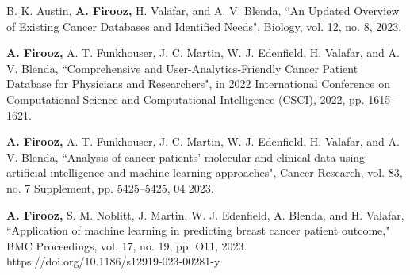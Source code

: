 
\def\spaceBetween{-1cm}
\def\spaceAfter{0.1cm}


\begin{cvpublication}
    \vspace{-2mm}
    \cvpub
        {\begin{cvitems}
            \item {B. K. Austin, \textbf{A. Firooz,} H. Valafar, and A. V. Blenda, “An Updated Overview of Existing Cancer Databases and Identified Needs", Biology, vol. 12, no. 8, 2023.}
        \end{cvitems}}
        {}
    \cvpub
        {\begin{cvitems}
            \item {\textbf{A. Firooz,} A. T. Funkhouser, J. C. Martin, W. J. Edenfield, H. Valafar, and A. V. Blenda, “Comprehensive and User-Analytics-Friendly Cancer Patient Database for Physicians and Researchers", in 2022 International Conference on Computational Science and Computational Intelligence (CSCI), 2022, pp. 1615–1621.}
        \end{cvitems}}
        {}
    \cvpub
        {\begin{cvitems}
            \item {\textbf{A. Firooz,} A. T. Funkhouser, J. C. Martin, W. J. Edenfield, H. Valafar, and A. V. Blenda, “Analysis of cancer patients’ molecular and clinical data using artificial intelligence and machine learning approaches", Cancer Research, vol. 83, no. 7 Supplement, pp. 5425–5425, 04 2023.}
        \end{cvitems}}
        {}
    \cvpub
        {\begin{cvitems}
            \item {\textbf{A. Firooz,} S. M. Noblitt, J. Martin, W. J. Edenfield, A. Blenda, and H. Valafar, “Application of machine learning in predicting breast cancer patient outcome," BMC Proceedings, vol. 17, no. 19, pp. O11, 2023. https://doi.org/10.1186/s12919-023-00281-y}

\end{cvitems}}
\end{cvpublication}
